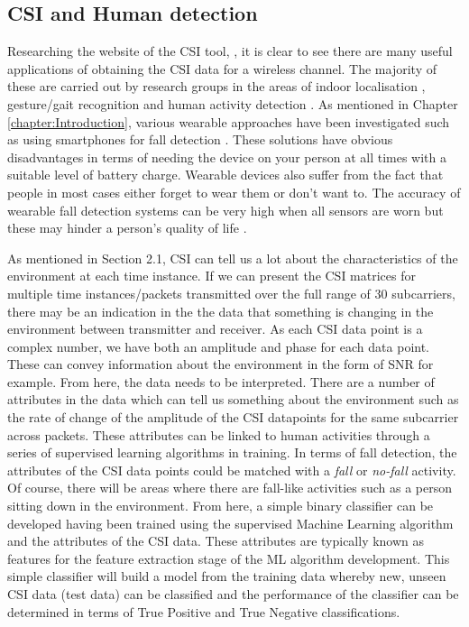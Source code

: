\subsection{CSI and Human detection}
Researching the website of the CSI tool, \cite{Halperin_csitool}, it is clear to see there are many useful applications of obtaining the CSI data for a wireless channel. The majority of these are carried out by research groups in the areas of indoor localisation \citep{FilaIndoor}, gesture/gait recognition \citep{gestureCSI,GaitRecogCSI}and human activity detection \citep{eEyesActivity}. As mentioned in Chapter \ref{chapter:Introduction}, various wearable approaches have been investigated such as using smartphones for fall detection \citep{smartPhoneFall}. These solutions have obvious disadvantages in terms of needing the device on your person at all times with a suitable level of battery charge. Wearable devices also suffer from the fact that people in most cases either forget to wear them or don't want to. The accuracy of wearable fall detection systems can be very high when all sensors are worn but these may hinder a person's quality of life \citep{ElderlyWearable}. \par
As mentioned in Section 2.1, CSI can tell us a lot about the characteristics of the environment at each time instance. If we can present the CSI matrices for multiple time instances/packets transmitted over the full range of 30 subcarriers, there may be an indication in the the data that something is changing in the environment between transmitter and receiver. As each CSI data point is a complex number, we have both an amplitude and phase for each data point. These can convey information about the environment in the form of SNR for example. From here, the data needs to be interpreted. There are a number of attributes in the data which can tell us something about the environment such as the rate of change of the amplitude of the CSI datapoints for the same subcarrier across packets. These attributes can be linked to human activities through a series of supervised learning algorithms in training. In terms of fall detection, the attributes of the CSI data points could be matched with a \textit{fall} or \textit{no-fall} activity. Of course, there will be areas where there are fall-like activities such as a person sitting down in the environment. From here, a simple binary classifier can be developed having been trained using the supervised Machine Learning algorithm and the attributes of the CSI data. These attributes are typically known as features for the feature extraction stage of the ML algorithm development. This simple classifier will build a model from the training data whereby new, unseen CSI data (test data) can be classified and the performance of the classifier can be determined in terms of True Positive and True Negative classifications. 
